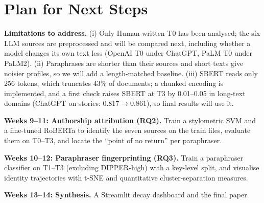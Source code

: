 \section{Plan for Next Steps}

\noindent\textbf{Limitations to address.} (i) Only Human-written T0 has been analysed; the six
LLM sources are preprocessed and will be compared next, including whether a model changes its
own text less (OpenAI T0 under ChatGPT, PaLM T0 under PaLM2). (ii) Paraphrases are shorter than
their sources and short texts give noisier profiles, so we will add a length-matched baseline.
(iii) SBERT reads only 256 tokens, which truncates 43\% of documents; a chunked encoding is
implemented, and a first check raises SBERT at T3 by 0.01--0.05 in long-text domains (ChatGPT on
stories: 0.817$\to$0.861), so final results will use it.

\noindent\textbf{Weeks 9--11: Authorship attribution (RQ2).} Train a stylometric SVM and a
fine-tuned RoBERTa to identify the seven sources on the train files, evaluate them on T0--T3, and
locate the ``point of no return'' per paraphraser.

\noindent\textbf{Weeks 10--12: Paraphraser fingerprinting (RQ3).} Train a paraphraser classifier
on T1--T3 (excluding DIPPER-high) with a key-level split, and visualise identity trajectories with
t-SNE and quantitative cluster-separation measures.

\noindent\textbf{Weeks 13--14: Synthesis.} A Streamlit decay dashboard and the final paper.

